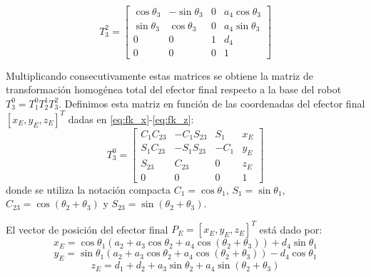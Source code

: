 \documentclass[conference,a4paper]{IEEEtran}
\begin{document}
\begin{equation}
T_3^2 = \begin{bmatrix} \cos\theta_3 & -\sin\theta_3 & 0 & a_4\cos\theta_3 \\ \sin\theta_3 & \cos\theta_3 & 0 & a_4\sin\theta_3 \\ 0 & 0 & 1 & d_4 \\ 0 & 0 & 0 & 1 \end{bmatrix}
\end{equation}

Multiplicando consecutivamente estas matrices se obtiene la matriz de transformación homogénea total del efector final respecto a la base del robot $T_3^0 = T_1^0 T_2^1 T_3^2$. Definimos esta matriz en función de las coordenadas del efector final $[x_E, y_E, z_E]^T$ dadas en \eqref{eq:fk_x}-\eqref{eq:fk_z}:
\begin{equation}
T_3^0 = \begin{bmatrix} C_1 C_{23} & -C_1 S_{23} & S_1 & x_E \\ S_1 C_{23} & -S_1 S_{23} & -C_1 & y_E \\ S_{23} & C_{23} & 0 & z_E \\ 0 & 0 & 0 & 1 \end{bmatrix}
\label{eq:matrix_total}
\end{equation}
donde se utiliza la notación compacta $C_1 = \cos\theta_1$, $S_1 = \sin\theta_1$, $C_{23} = \cos(\theta_2+\theta_3)$ y $S_{23} = \sin(\theta_2+\theta_3)$.

El vector de posición del efector final $P_E = [x_E, y_E, z_E]^T$ está dado por:
\begin{equation}
x_E = \cos\theta_1 \left( a_2 + a_3 \cos\theta_2 + a_4 \cos(\theta_2 + \theta_3) \right) + d_4 \sin\theta_1
\label{eq:fk_x}
\end{equation}
\begin{equation}
y_E = \sin\theta_1 \left( a_2 + a_3 \cos\theta_2 + a_4 \cos(\theta_2 + \theta_3) \right) - d_4 \cos\theta_1
\label{eq:fk_y}
\end{equation}
\begin{equation}
z_E = d_1 + d_2 + a_3 \sin\theta_2 + a_4 \sin(\theta_2 + \theta_3)
\label{eq:fk_z}
\end{equation}
\end{document}
